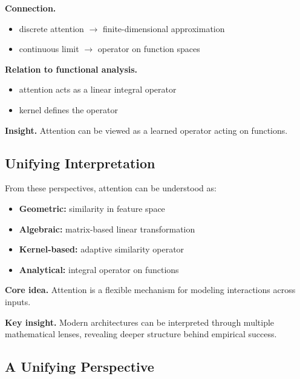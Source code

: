 \medskip

\noindent
\textbf{Connection.}

\begin{itemize}
    \item discrete attention $\rightarrow$ finite-dimensional approximation
    \item continuous limit $\rightarrow$ operator on function spaces
\end{itemize}

\medskip

\noindent
\textbf{Relation to functional analysis.}

\begin{itemize}
    \item attention acts as a linear integral operator
    \item kernel defines the operator
\end{itemize}

\medskip

\noindent
\textbf{Insight.}  
Attention can be viewed as a learned operator acting on functions.

\subsection{Unifying Interpretation}

From these perspectives, attention can be understood as:

\begin{itemize}
    \item \textbf{Geometric:} similarity in feature space
    \item \textbf{Algebraic:} matrix-based linear transformation
    \item \textbf{Kernel-based:} adaptive similarity operator
    \item \textbf{Analytical:} integral operator on functions
\end{itemize}

\medskip

\noindent
\textbf{Core idea.}  
Attention is a flexible mechanism for modeling interactions across inputs.

\medskip

\noindent
\textbf{Key insight.}  
Modern architectures can be interpreted through multiple mathematical lenses, revealing deeper structure behind empirical success.

\subsection{A Unifying Perspective}

